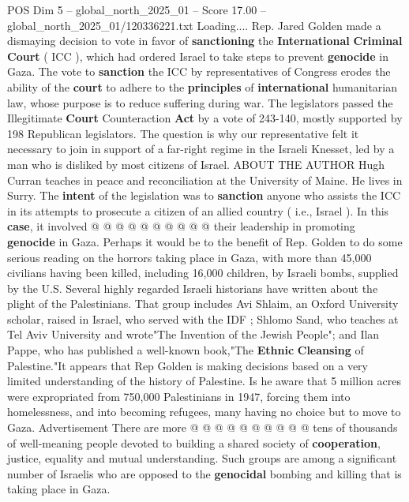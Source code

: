 \begin{textsample}{POS Dim 5 – global\_north\_2025\_01 – Score 17.00 – global\_north\_2025\_01/120336221.txt}  \label{ex:f5_pos_267}
Loading....
Rep.
Jared Golden made a dismaying decision to vote in favor of \textbf{sanctioning} the \textbf{International} \textbf{Criminal} \textbf{Court} ( ICC ), which had ordered Israel to take steps to prevent \textbf{genocide} in Gaza.
The vote to \textbf{sanction} the ICC by representatives of Congress erodes the ability of the \textbf{court} to adhere to the \textbf{principles} of \textbf{international} humanitarian law, whose purpose is to reduce suffering during war.
The legislators passed the Illegitimate \textbf{Court} Counteraction \textbf{Act} by a vote of 243-140, mostly supported by 198 Republican legislators.
The question is why our representative felt it necessary to join in support of a far-right regime in the Israeli Knesset, led by a man who is disliked by most citizens of Israel.
ABOUT THE AUTHOR Hugh Curran teaches in peace and reconciliation at the University of Maine.
He lives in Surry.
The \textbf{intent} of the legislation was to \textbf{sanction} anyone who assists the ICC in its attempts to prosecute a citizen of an allied country ( i.e., Israel ).
In this \textbf{case}, it involved @ @ @ @ @ @ @ @ @ @ their leadership in promoting \textbf{genocide} in Gaza.
Perhaps it would be to the benefit of Rep.
Golden to do some serious reading on the horrors taking place in Gaza, with more than 45,000 civilians having been killed, including 16,000 children, by Israeli bombs, supplied by the U.S.
Several highly regarded Israeli historians have written about the plight of the Palestinians.
That group includes Avi Shlaim, an Oxford University scholar, raised in Israel, who served with the IDF ; Shlomo Sand, who teaches at Tel Aviv University and wrote"The Invention of the Jewish People"; and Ilan Pappe, who has published a well-known book,"The \textbf{Ethnic} \textbf{Cleansing} of Palestine."It appears that Rep Golden is making decisions based on a very limited understanding of the history of Palestine.
Is he aware that 5 million acres were expropriated from 750,000 Palestinians in 1947, forcing them into homelessness, and into becoming refugees, many having no choice but to move to Gaza.
Advertisement There are more @ @ @ @ @ @ @ @ @ @ tens of thousands of well-meaning people devoted to building a shared society of \textbf{cooperation}, justice, equality and mutual understanding.
Such groups are among a significant number of Israelis who are opposed to the \textbf{genocidal} bombing and killing that is taking place in Gaza.

\end{textsample}
